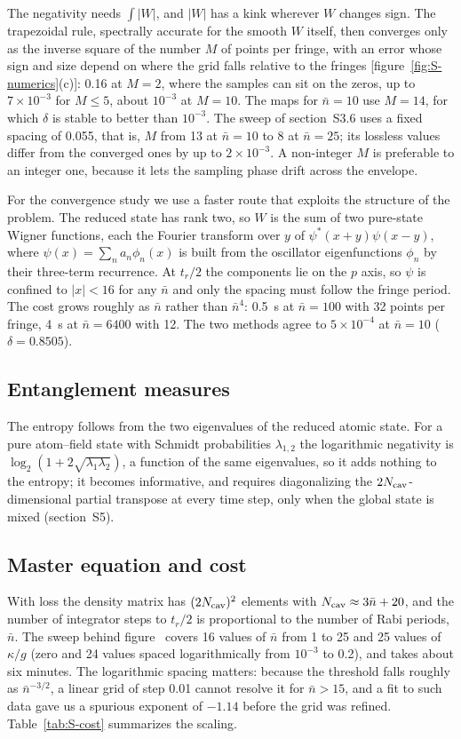\documentclass{iopjournal}
\newcommand{\nbar}{\bar{n}}
\begin{document}
The negativity needs $\int|W|$, and $|W|$ has a kink wherever $W$ changes sign. The trapezoidal rule, spectrally accurate for the smooth $W$ itself, then converges only as the inverse square of the number $M$ of points per fringe, with an error whose sign and size depend on where the grid falls relative to the fringes [figure~\ref{fig:S-numerics}(c)]: 0.16 at $M = 2$, where the samples can sit on the zeros, up to $7\times10^{-3}$ for $M\leq5$, about $10^{-3}$ at $M = 10$. The maps for $\nbar = 10$ use $M = 14$, for which $\delta$ is stable to better than $10^{-3}$. The sweep of section~S3.6 uses a fixed spacing of 0.055, that is, $M$ from 13 at $\nbar = 10$ to 8 at $\nbar = 25$; its lossless values differ from the converged ones by up to $2\times10^{-3}$. A non-integer $M$ is preferable to an integer one, because it lets the sampling phase drift across the envelope.

For the convergence study we use a faster route that exploits the structure of the problem. The reduced state has rank two, so $W$ is the sum of two pure-state Wigner functions, each the Fourier transform over $y$ of $\psi^*(x+y)\psi(x-y)$, where $\psi(x) = \sum_n a_n\phi_n(x)$ is built from the oscillator eigenfunctions $\phi_n$ by their three-term recurrence. At $t_r/2$ the components lie on the $p$ axis, so $\psi$ is confined to $|x|<16$ for any $\nbar$ and only the spacing must follow the fringe period. The cost grows roughly as $\nbar$ rather than $\nbar^4$: 0.5~s at $\nbar = 100$ with 32 points per fringe, 4~s at $\nbar = 6400$ with 12. The two methods agree to $5\times10^{-4}$ at $\nbar = 10$ ($\delta = 0.8505$).

\subsection{Entanglement measures}
The entropy follows from the two eigenvalues of the reduced atomic state. For a pure atom--field state with Schmidt probabilities $\lambda_{1,2}$ the logarithmic negativity is $\log_2(1+2\sqrt{\lambda_1\lambda_2})$, a function of the same eigenvalues, so it adds nothing to the entropy; it becomes informative, and requires diagonalizing the $2N_{\rm cav}$-dimensional partial transpose at every time step, only when the global state is mixed (section~S5).

\subsection{Master equation and cost}
With loss the density matrix has $(2N_{\rm cav})^2$ elements with $N_{\rm cav}\approx3\nbar+20$, and the number of integrator steps to $t_r/2$ is proportional to the number of Rabi periods, $\nbar$. The sweep behind figure~ covers 16 values of $\nbar$ from 1 to 25 and 25 values of $\kappa/g$ (zero and 24 values spaced logarithmically from $10^{-3}$ to 0.2), and takes about six minutes. The logarithmic spacing matters: because the threshold falls roughly as $\nbar^{-3/2}$, a linear grid of step 0.01 cannot resolve it for $\nbar>15$, and a fit to such data gave us a spurious exponent of $-1.14$ before the grid was refined. Table~\ref{tab:S-cost} summarizes the scaling.
\end{document}
